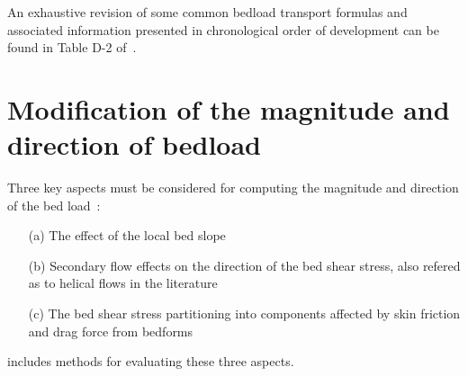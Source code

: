 \noindent
An exhaustive revision of some common bedload transport formulas and associated information presented in chronological order of development can be found in Table D-2 of~\cite{GarciaBook2006}.

\section{Modification of the magnitude and direction of bedload}\label{sec:corrections}
Three key aspects must be considered for computing the magnitude and direction of the bed load~\cite{Abad08}:
\begin{itemize}
\item[(a)] The effect of the local bed slope
\item[(b)] Secondary flow effects on the direction of the bed shear stress, also refered as to helical flows in the literature
\item[(c)] The bed shear stress partitioning into components affected by skin friction and drag force from bedforms
\end{itemize}
\noindent
\gaia{} includes methods for evaluating these three aspects.

